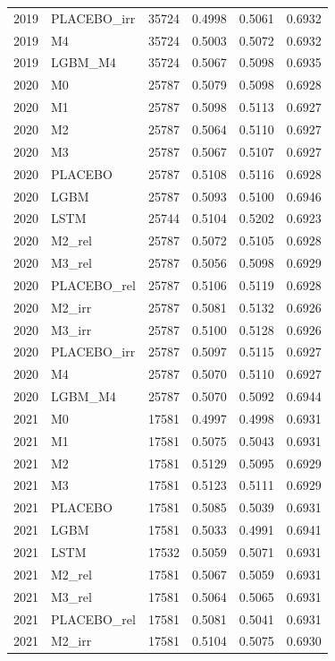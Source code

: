 \begin{tabular}{llrrrr}
2019 & PLACEBO\_irr & 35724 & 0.4998 & 0.5061 & 0.6932 \\
2019 & M4 & 35724 & 0.5003 & 0.5072 & 0.6932 \\
2019 & LGBM\_M4 & 35724 & 0.5067 & 0.5098 & 0.6935 \\
2020 & M0 & 25787 & 0.5079 & 0.5098 & 0.6928 \\
2020 & M1 & 25787 & 0.5098 & 0.5113 & 0.6927 \\
2020 & M2 & 25787 & 0.5064 & 0.5110 & 0.6927 \\
2020 & M3 & 25787 & 0.5067 & 0.5107 & 0.6927 \\
2020 & PLACEBO & 25787 & 0.5108 & 0.5116 & 0.6928 \\
2020 & LGBM & 25787 & 0.5093 & 0.5100 & 0.6946 \\
2020 & LSTM & 25744 & 0.5104 & 0.5202 & 0.6923 \\
2020 & M2\_rel & 25787 & 0.5072 & 0.5105 & 0.6928 \\
2020 & M3\_rel & 25787 & 0.5056 & 0.5098 & 0.6929 \\
2020 & PLACEBO\_rel & 25787 & 0.5106 & 0.5119 & 0.6928 \\
2020 & M2\_irr & 25787 & 0.5081 & 0.5132 & 0.6926 \\
2020 & M3\_irr & 25787 & 0.5100 & 0.5128 & 0.6926 \\
2020 & PLACEBO\_irr & 25787 & 0.5097 & 0.5115 & 0.6927 \\
2020 & M4 & 25787 & 0.5070 & 0.5110 & 0.6927 \\
2020 & LGBM\_M4 & 25787 & 0.5070 & 0.5092 & 0.6944 \\
2021 & M0 & 17581 & 0.4997 & 0.4998 & 0.6931 \\
2021 & M1 & 17581 & 0.5075 & 0.5043 & 0.6931 \\
2021 & M2 & 17581 & 0.5129 & 0.5095 & 0.6929 \\
2021 & M3 & 17581 & 0.5123 & 0.5111 & 0.6929 \\
2021 & PLACEBO & 17581 & 0.5085 & 0.5039 & 0.6931 \\
2021 & LGBM & 17581 & 0.5033 & 0.4991 & 0.6941 \\
2021 & LSTM & 17532 & 0.5059 & 0.5071 & 0.6931 \\
2021 & M2\_rel & 17581 & 0.5067 & 0.5059 & 0.6931 \\
2021 & M3\_rel & 17581 & 0.5064 & 0.5065 & 0.6931 \\
2021 & PLACEBO\_rel & 17581 & 0.5081 & 0.5041 & 0.6931 \\
2021 & M2\_irr & 17581 & 0.5104 & 0.5075 & 0.6930 \\

\end{tabular}
